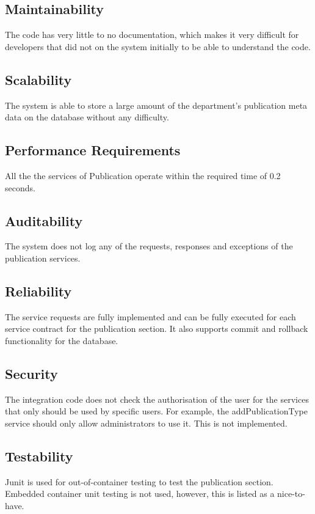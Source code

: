 \documentclass{article}
\begin{document}
    \subsection{Maintainability}
    The code has very little to no documentation, which makes it very difficult for developers that did not on the system initially to be able to understand the code.
    
    \subsection{Scalability}
    The system is able to store a large amount of the department's publication meta data on the database without any difficulty.
    
    \subsection{Performance Requirements}
    All the the services of Publication operate within the required time of 0.2 seconds.
    
    \subsection{Auditability}
    The system does not log any of the requests, responses and exceptions of the publication services.
    
    
    \subsection{Reliability}
    The service requests are fully implemented and can be fully executed for each service contract for the publication section. It also supports commit and rollback functionality for the database.
    
    \subsection{Security}
    The integration code does not check the authorisation of the user for the services that only should be used by specific users. For example, the addPublicationType service should only allow administrators to use it. This is not implemented.
    
    \subsection{Testability}
    Junit is used for out-of-container testing to test the publication section. Embedded container unit testing is not used, however, this is listed as a nice-to-have.
\end{document}
